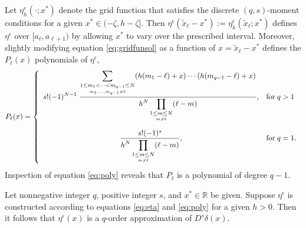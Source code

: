 Let $\eta_h^\epsilon(\cdot;x^*)$ denote the grid function that satisfies the discrete $(q,s)$-moment conditions for a given $x^*\in(-\zeta,h-\zeta]$.
Then $\eta^\epsilon(\tilde x_\ell - x^*) := \eta_h^\epsilon(\tilde x_\ell; x^*)$  defines $\eta^\epsilon$ over $[a_\ell,a_{\ell+1})$ by allowing $x^*$ to vary over the prescribed interval. 
Moreover, slightly modifying equation \ref{eq:gridfunsol} as a function of $x=\tilde x_\ell - x^*$ defines the $P_\ell(x)$ polynomials of $\eta^\epsilon$,
\begin{equation}\label{eq:poly}
	 P_\ell(x) = \left\{ \begin{array}{cl}
		\displaystyle
		s! (-1)^{N-1} \; 
		\frac{
			\displaystyle
			\sum_{\underset{m_1,...,m_{q-1}\neq \ell}{1\le m_1<\cdots<m_{q-1}\le N}}
			 ( h(m_1- \ell) + x) \cdots ( h(m_{q-1} - \ell) + x)
		}
		{
			\displaystyle
			h^{N}\prod_{\underset{m\neq \ell}{1\le m\le N}} ( \ell - m)
		}
		,& \text{for} \; q>1  \vspace{10pt} \\ 
		\displaystyle
		\frac{
			s! (-1)^{s}
		}
		{
			\displaystyle
			h^{N} \prod_{\underset{m\neq \ell}{1\le m\le N}} (\ell - m)
		}
		,& \text{for}\; q=1.
	\end{array}\right.
\end{equation}
Inspection of equation \ref{eq:poly} reveals that $P_\ell$ is a polynomial of degree $q-1$.


\begin{theorem}\label{thm:DCmomcond}
	Let nonnegative integer $q$, positive integer $s$, and $x^*\in \mathbb R$ be given. 
	Suppose $\eta^\epsilon$ is constructed according to equations \ref{eq:eta} and \ref{eq:poly} for a given $h>0$.
	Then it follows that $\eta^\epsilon(x)$ is a $q$-order approximation of $D^s\delta(x)$. 
\end{theorem}


